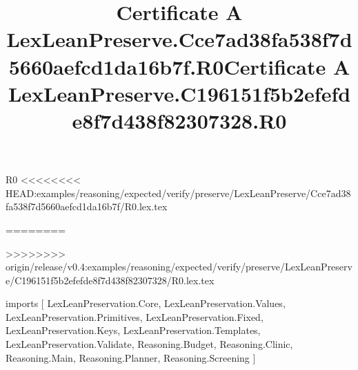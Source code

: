\begin{lexlean}{R0}
<<<<<<<< HEAD:examples/reasoning/expected/verify/preserve/LexLeanPreserve/Cce7ad38fa538f7d5660aefcd1da16b7f/R0.lex.tex
\title{Certificate A LexLeanPreserve.Cce7ad38fa538f7d5660aefcd1da16b7f.R0}
========
\title{Certificate A LexLeanPreserve.C196151f5b2efefde8f7d438f82307328.R0}
>>>>>>>> origin/release/v0.4:examples/reasoning/expected/verify/preserve/LexLeanPreserve/C196151f5b2efefde8f7d438f82307328/R0.lex.tex
\begin{coremodule}
imports [
  LexLeanPreservation.Core,
  LexLeanPreservation.Values,
  LexLeanPreservation.Primitives,
  LexLeanPreservation.Fixed,
  LexLeanPreservation.Keys,
  LexLeanPreservation.Templates,
  LexLeanPreservation.Validate,
  Reasoning.Budget,
  Reasoning.Clinic,
  Reasoning.Main,
  Reasoning.Planner,
  Reasoning.Screening
]


\end{coremodule}
\end{lexlean}
